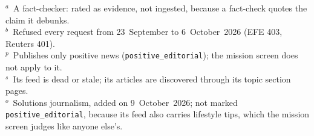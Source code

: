 \noindent
$^{a}$~A fact-checker: rated as evidence, not ingested, because a
fact-check quotes the claim it debunks.\\
$^{b}$~Refused every request from 23~September to 6~October~2026
(EFE 403, Reuters 401).\\
$^{p}$~Publishes only positive news (\texttt{positive\_editorial}); the
mission screen does not apply to it.\\
$^{s}$~Its feed is dead or stale; its articles are discovered through
its topic section pages.\\
$^{o}$~Solutions journalism, added on 9~October~2026; not marked
\texttt{positive\_editorial}, because its feed also carries lifestyle
tips, which the mission screen judges like anyone else's.
